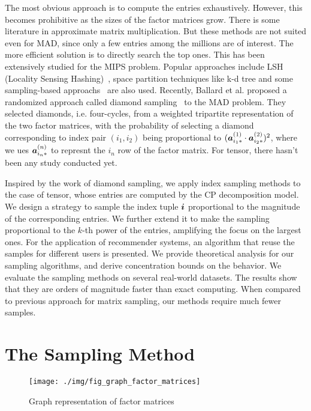 \documentclass[letterpaper]{article}
\newcommand{\V}[1]{{\boldsymbol{{\MakeLowercase{#1}}}}}
\newcommand{\RowVecA}[1]{\V{a}^{(#1)}_{i_#1*}}
\begin{document}
The most obvious approach is to compute the entries exhaustively. 
However, this becomes prohibitive as the sizes of the factor matrices grow. 
There is some literature in approximate matrix multiplication. 
But these methods are not suited even for MAD, 
since only a few entries among the millions are of interest. 
The more efficient solution is to directly search the top ones. 
This has been extensively studied for the MIPS problem.
Popular approaches include LSH (Locality Sensing Hashing)~\cite{Andoni08,ALSH14},
space partition techniques like k-d tree 
and some sampling-based approachs~\cite{Drineas2006,John15} are also used.
Recently, Ballard et al. proposed a randomized approach called diamond sampling~\cite{BaPiKoSe15} to the MAD problem. 
They selected diamonds, i.e. four-cycles, from a weighted tripartite representation of the two factor matrices, 
with the probability of selecting a diamond corresponding to index pair $(i_1,i_2)$ 
being proportional to $(\RowVecA{1}\cdot\RowVecA{2})^2$,
where we ues $\RowVecA{n}$ to represnt the $i_n$ row of the factor matrix.
For tensor, there hasn't been any study conducted yet.

Inspired by the work of diamond sampling,
we apply index sampling methods to the case of tensor, 
whose entries are computed by the CP decomposition model. 
We design a strategy to sample the index tuple $\V{i}$ proportional to the magnitude of the corresponding entries. 
We further extend it to make the sampling proportional to the $k$-th power of the entries,
amplifying the focus on the largest ones. 
For the application of recommender systems, 
an algorithm that reuse the samples for different users is presented. 
We provide theoretical analysis for our sampling algorithms, 
and derive concentration bounds on the behavior. 
We evaluate the sampling methods on several real-world datasets. 
The results show that they are orders of magnitude faster than exact computing. 
When compared to previous approach for matrix sampling, our methods require much fewer samples.

\section{The Sampling Method}
\begin{figure}[!ht]
  \centering
  \texttt{[image: ./img/fig\_graph\_factor\_matrices]}\\
  \caption{Graph representation of factor matrices}
  \label{fig:GraphMatrices}
\end{figure}
\end{document}
